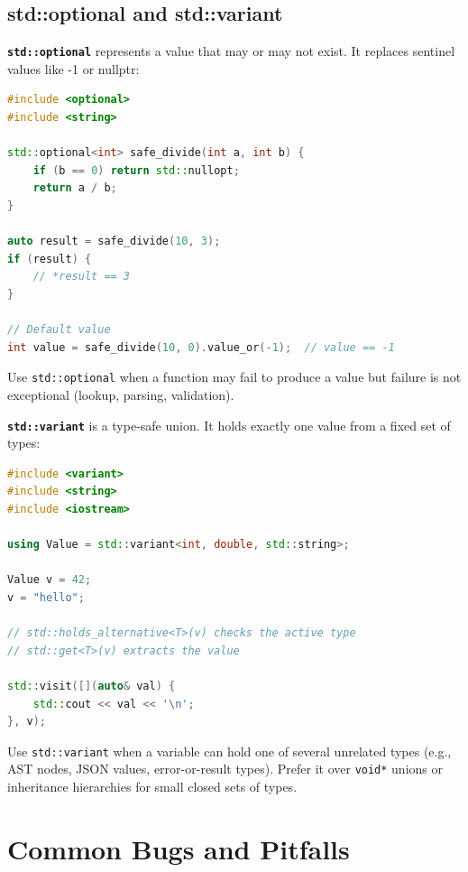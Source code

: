\subsection{std::optional and std::variant}

\textbf{\texttt{std::optional}} represents a value that may or may not exist. It replaces sentinel values like -1 or nullptr:

\begin{lstlisting}[language=C++]
#include <optional>
#include <string>

std::optional<int> safe_divide(int a, int b) {
    if (b == 0) return std::nullopt;
    return a / b;
}

auto result = safe_divide(10, 3);
if (result) {
    // *result == 3
}

// Default value
int value = safe_divide(10, 0).value_or(-1);  // value == -1
\end{lstlisting}

Use \texttt{std::optional} when a function may fail to produce a value but failure is not exceptional (lookup, parsing, validation).

\textbf{\texttt{std::variant}} is a type-safe union. It holds exactly one value from a fixed set of types:

\begin{lstlisting}[language=C++]
#include <variant>
#include <string>
#include <iostream>

using Value = std::variant<int, double, std::string>;

Value v = 42;
v = "hello";

// std::holds_alternative<T>(v) checks the active type
// std::get<T>(v) extracts the value

std::visit([](auto& val) {
    std::cout << val << '\n';
}, v);
\end{lstlisting}

Use \texttt{std::variant} when a variable can hold one of several unrelated types (e.g., AST nodes, JSON values, error-or-result types). Prefer it over \texttt{void*} unions or inheritance hierarchies for small closed sets of types.

\section{Common Bugs and Pitfalls}


